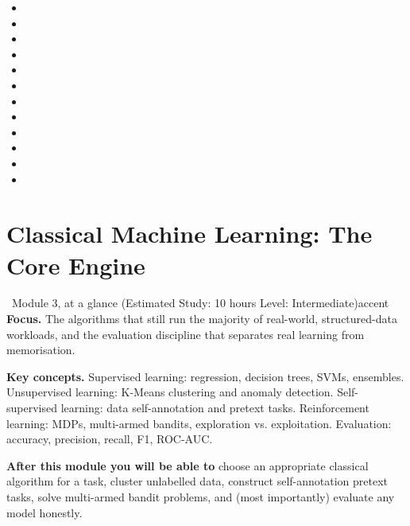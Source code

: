 \documentclass[11pt,a4paper]{article}
\begin{document}
	\begin{sourcesbox}
		\small
		\begin{itemize}[nosep]
			\item {}
			\item {}
			\item {}
			\item {}
			\item {}
			\item {}
			\item {}
			\item {}
			\item {}
			\item {}
			\item {}
			\item {}
		\end{itemize}
	\end{sourcesbox}
	
	\clearpage
	\section{Classical Machine Learning: The Core Engine}
	
	\begin{modulecard}{\faRobot\ Module 3, at a glance \hfill \small\normalfont (Estimated Study: 10 hours \textbullet{} Level: Intermediate)}{accent}
		\textbf{Focus.} The algorithms that still run the majority of
		real-world, structured-data workloads, and the evaluation discipline
		that separates real learning from memorisation.
		
		\medskip
		\textbf{Key concepts.} Supervised learning: regression, decision trees,
		SVMs, ensembles. Unsupervised learning: K-Means clustering and anomaly
		detection. Self-supervised learning: data self-annotation and pretext tasks. Reinforcement learning: MDPs, multi-armed bandits, exploration vs. exploitation. Evaluation: accuracy, precision, recall, F1, ROC-AUC.
		
		\medskip
		\textbf{After this module you will be able to} choose an appropriate
		classical algorithm for a task, cluster unlabelled data, construct self-annotation pretext tasks, solve multi-armed bandit problems, and (most
		importantly) evaluate any model honestly.
	\end{modulecard}
	
\end{document}
